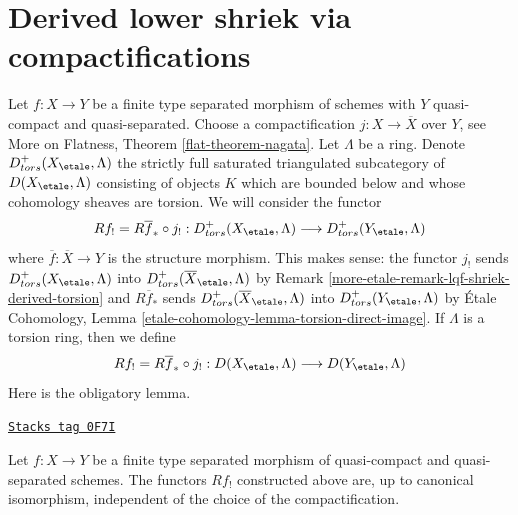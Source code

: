 \section{Derived lower shriek via compactifications}
\label{more-etale-section-derived-lower-shriek-compactification}
Let $f : X \to Y$ be a finite type separated morphism of schemes
with $Y$ quasi-compact and quasi-separated. Choose a compactification
$j : X \to \overline{X}$ over $Y$, see
More on Flatness, Theorem \ref{flat-theorem-nagata}.
Let $\Lambda$ be a ring. Denote $D^+_{tors}(X_\etale, \Lambda)$
the strictly full saturated triangulated subcategory of
$D(X_\etale, \Lambda)$ consisting of objects $K$ which are bounded below
and whose cohomology sheaves are torsion. We will consider the
functor
$$
Rf_! = R\overline{f}_* \circ j_! :
D^+_{tors}(X_\etale, \Lambda)
\longrightarrow
D^+_{tors}(Y_\etale, \Lambda)
$$
where $\overline{f} : \overline{X} \to Y$ is the structure morphism.
This makes sense: the functor $j_!$ sends $D^+_{tors}(X_\etale, \Lambda)$ into
$D^+_{tors}(\overline{X}_\etale, \Lambda)$ by
Remark \ref{more-etale-remark-lqf-shriek-derived-torsion} and $R\overline{f}_*$ sends
$D^+_{tors}(\overline{X}_\etale, \Lambda)$ into $D^+_{tors}(Y_\etale, \Lambda)$
by \'Etale Cohomology, Lemma \ref{etale-cohomology-lemma-torsion-direct-image}.
If $\Lambda$ is a torsion ring, then we define
$$
Rf_! = R\overline{f}_* \circ j_! :
D(X_\etale, \Lambda)
\longrightarrow
D(Y_\etale, \Lambda)
$$
Here is the obligatory lemma.

\begin{lemma}
\label{more-etale-lemma-shriek-well-defined}
\href{https://stacks.math.columbia.edu/tag/0F7I}{\texttt{Stacks tag 0F7I}}

Let $f : X \to Y$ be a finite type separated morphism of quasi-compact
and quasi-separated schemes. The functors $Rf_!$ constructed above
are, up to canonical isomorphism, independent of the choice of the
compactification.
\end{lemma}

